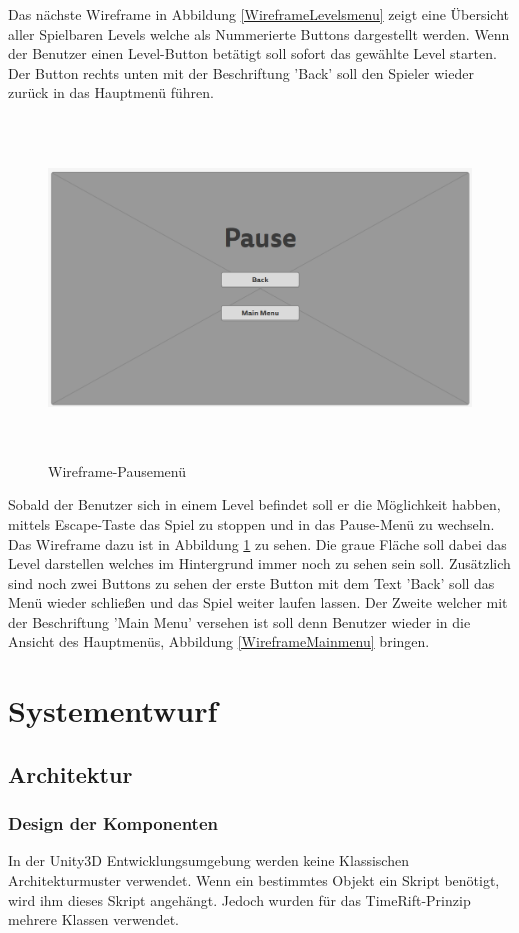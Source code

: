 Das nächste Wireframe in Abbildung \ref{WireframeLevelsmenu} zeigt eine Übersicht aller Spielbaren Levels welche als Nummerierte Buttons dargestellt werden. Wenn der Benutzer einen Level-Button betätigt soll  sofort das gewählte Level starten. Der Button rechts unten mit der Beschriftung 'Back' soll den Spieler wieder zurück in das Hauptmenü führen. 
\begin{figure}[H]
	\centering
	\includegraphics[width=16cm, height=9cm]{images/WireframePausemenu.png}
	\caption{Wireframe-Pausemenü}
	\label{WireframePausemenu}
\end{figure}
Sobald der Benutzer sich in einem Level befindet soll er die Möglichkeit habben, mittels Escape-Taste das Spiel zu stoppen und in das Pause-Menü zu wechseln. Das Wireframe dazu ist in Abbildung \ref{WireframePausemenu} zu sehen. Die graue Fläche soll dabei das Level darstellen welches im Hintergrund immer noch zu sehen sein soll. Zusätzlich sind noch zwei Buttons zu sehen der erste Button mit dem Text 'Back' soll das Menü wieder schließen und das Spiel weiter laufen lassen. Der Zweite welcher mit der Beschriftung 'Main Menu' versehen ist soll denn Benutzer wieder in die Ansicht des Hauptmenüs, Abbildung \ref{WireframeMainmenu} bringen. 
\chapter{Systementwurf}

\section{Architektur}

\subsection{Design der Komponenten}
In der Unity3D Entwicklungsumgebung werden keine Klassischen Architekturmuster verwendet. Wenn ein bestimmtes Objekt ein Skript benötigt, wird ihm dieses Skript angehängt. Jedoch wurden für das TimeRift-Prinzip mehrere Klassen verwendet.


